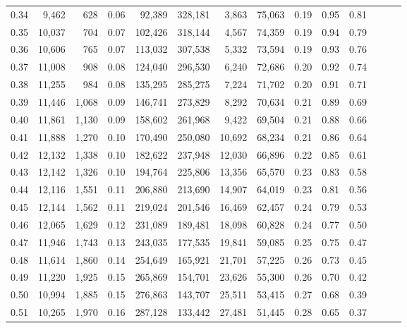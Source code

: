 \begin{tabular}{rrrrrrrrrrrrrr}
0.34 &   9,462 &    628 &  0.06 &   92,389 &  328,181 &   3,863 &  75,063 &  0.19 &  0.95 &      0.81 \\
0.35 &  10,037 &    704 &  0.07 &  102,426 &  318,144 &   4,567 &  74,359 &  0.19 &  0.94 &      0.79 \\
0.36 &  10,606 &    765 &  0.07 &  113,032 &  307,538 &   5,332 &  73,594 &  0.19 &  0.93 &      0.76 \\
0.37 &  11,008 &    908 &  0.08 &  124,040 &  296,530 &   6,240 &  72,686 &  0.20 &  0.92 &      0.74 \\
0.38 &  11,255 &    984 &  0.08 &  135,295 &  285,275 &   7,224 &  71,702 &  0.20 &  0.91 &      0.71 \\
0.39 &  11,446 &  1,068 &  0.09 &  146,741 &  273,829 &   8,292 &  70,634 &  0.21 &  0.89 &      0.69 \\
0.40 &  11,861 &  1,130 &  0.09 &  158,602 &  261,968 &   9,422 &  69,504 &  0.21 &  0.88 &      0.66 \\
0.41 &  11,888 &  1,270 &  0.10 &  170,490 &  250,080 &  10,692 &  68,234 &  0.21 &  0.86 &      0.64 \\
0.42 &  12,132 &  1,338 &  0.10 &  182,622 &  237,948 &  12,030 &  66,896 &  0.22 &  0.85 &      0.61 \\
0.43 &  12,142 &  1,326 &  0.10 &  194,764 &  225,806 &  13,356 &  65,570 &  0.23 &  0.83 &      0.58 \\
0.44 &  12,116 &  1,551 &  0.11 &  206,880 &  213,690 &  14,907 &  64,019 &  0.23 &  0.81 &      0.56 \\
0.45 &  12,144 &  1,562 &  0.11 &  219,024 &  201,546 &  16,469 &  62,457 &  0.24 &  0.79 &      0.53 \\
0.46 &  12,065 &  1,629 &  0.12 &  231,089 &  189,481 &  18,098 &  60,828 &  0.24 &  0.77 &      0.50 \\
0.47 &  11,946 &  1,743 &  0.13 &  243,035 &  177,535 &  19,841 &  59,085 &  0.25 &  0.75 &      0.47 \\
0.48 &  11,614 &  1,860 &  0.14 &  254,649 &  165,921 &  21,701 &  57,225 &  0.26 &  0.73 &      0.45 \\
0.49 &  11,220 &  1,925 &  0.15 &  265,869 &  154,701 &  23,626 &  55,300 &  0.26 &  0.70 &      0.42 \\
0.50 &  10,994 &  1,885 &  0.15 &  276,863 &  143,707 &  25,511 &  53,415 &  0.27 &  0.68 &      0.39 \\
0.51 &  10,265 &  1,970 &  0.16 &  287,128 &  133,442 &  27,481 &  51,445 &  0.28 &  0.65 &      0.37 \\

\end{tabular}
